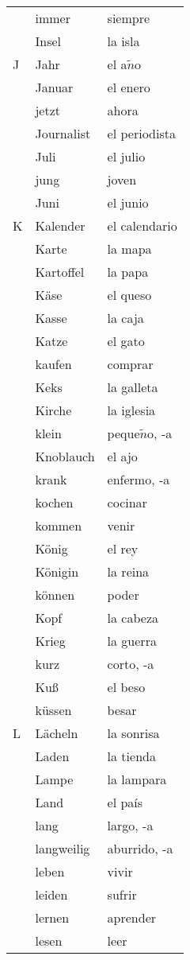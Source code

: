 \documentclass[10pt,spanish]{article}
\begin{document}
\begin{longtable}{p{} p{} | p{}}
& immer & siempre  \\
& Insel & la isla  \\
J & Jahr & el a$\tilde{n}$o \\
& Januar & el enero  \\
& jetzt & ahora \\
& Journalist & el periodista  \\
& Juli & el julio  \\
& jung & joven \\
& Juni & el junio  \\
K & Kalender & el calendario  \\
& Karte & la mapa  \\
& Kartoffel & la papa  \\
& Käse & el queso  \\
& Kasse & la caja  \\
& Katze & el gato  \\
& kaufen & comprar  \\
& Keks & la galleta  \\
& Kirche & la iglesia  \\
& klein & peque$\tilde{n}$o, -a  \\
& Knoblauch & el ajo  \\
& krank & enfermo, -a \\
& kochen & cocinar  \\
& kommen & venir  \\
& König & el rey  \\
& Königin & la reina  \\
& können & poder  \\
& Kopf & la cabeza \\
& Krieg & la guerra  \\
& kurz & corto, -a  \\
& Kuß & el beso  \\
& küssen & besar  \\
L & Lächeln & la sonrisa  \\
& Laden & la tienda  \\
& Lampe & la lampara  \\
& Land & el país  \\
& lang & largo, -a  \\
& langweilig & aburrido, -a\\
& leben & vivir  \\
& leiden & sufrir  \\
& lernen & aprender  \\
& lesen & leer  \\

\end{longtable}
\end{document}
